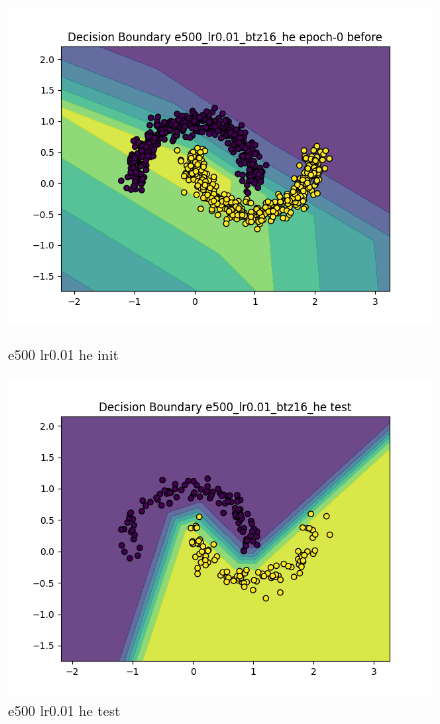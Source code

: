 \documentclass[8pt]{article}
\begin{document}
\begin{figure}[H]
    \centering
    \begin{minipage}{0.32\textwidth}
        \centering
        \includegraphics[width=\textwidth]{../Prob4/out/1024_173617/e500_lr0.01_btz16_he/decision_boundary_epoch-0 before.png}
        \caption{e500 lr0.01 he init}
        \label{fig:e500 lr0.01 he init}
    \end{minipage}
    \begin{minipage}{0.32\textwidth}
        \centering
        \includegraphics[width=\textwidth]{../Prob4/out/1024_173617/e500_lr0.01_btz16_he/decision_boundary_test.png}
        \caption{e500 lr0.01 he test}
        \label{fig:e500 lr0.01 he test}
    \end{minipage}

\end{figure}
\end{document}
